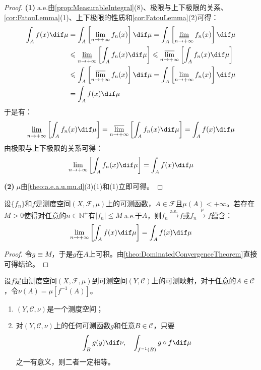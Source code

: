 \begin{proof}
	\textbf{(1)$\;\text{a.e.}$}由\cref{prop:MeasurableIntegral}(8)、极限与上下极限的关系、\cref{cor:FatouLemma}(1)、上下极限的性质和\cref{cor:FatouLemma}(2)可得：
	\begin{align*}
		\int_{A}f(x)\dif\mu&=\int_{A}\left[\lim_{n\to+\infty}f_n(x)\right]\dif\mu=\int_{A}\left[\varliminf_{n\to+\infty}f_n(x)\right]\dif\mu \\
		&\leqslant\varliminf_{n\to+\infty}\left[\int_{A}f_n(x)\dif\mu\right]\leqslant\varlimsup_{n\to+\infty}\left[\int_{A}f_n(x)\dif\mu\right] \\
		&\leqslant\int_{A}\left[\varlimsup_{n\to+\infty}f_n(x)\right]\dif\mu=\int_{A}\left[\lim_{n\to+\infty}f_n(x)\right]\dif\mu \\
		&=\int_{A}f(x)\dif\mu
	\end{align*}
	于是有：
	\begin{equation*}
		\varliminf_{n\to+\infty}\left[\int_{A}f_n(x)\dif\mu\right]=\varlimsup_{n\to+\infty}\left[\int_{A}f_n(x)\dif\mu\right]=\int_{A}f(x)\dif\mu
	\end{equation*}
	由极限与上下极限的关系可得：
	\begin{equation*}
		\lim_{n\to+\infty}\left[\int_{A}f_n(x)\dif\mu\right]=\int_{A}f(x)\dif\mu
	\end{equation*}\par
	\textbf{(2)$\;\mu$}由\cref{theo:a.e.a.u.mu.d}(3)(1)和(1)立即可得。
\end{proof}
\begin{corollary}[Lebesgue有界收敛定理]
	设$\{f_n\}$和$f$是测度空间$(X,\mathscr{F},\mu)$上的可测函数，$A\in\mathscr{F}$且$\mu(A)<+\infty$。若存在$M>0$使得对任意的$n\in\mathbb{N}^+$有$|f_n|\leqslant M\;$a.e.于$A$，则$f_n\overset{\text{a.e.}}{\longrightarrow}f$或$f_n\overset{\mu}{\longrightarrow}f$蕴含：
	\begin{equation*}
		\lim_{n\to+\infty}\left[\int_{A}f(x)\dif\mu\right]=\int_{A}f(x)\dif\mu
	\end{equation*}
\end{corollary}
\begin{proof}
	令$g\equiv M$，于是$g$在$A$上可积。由\cref{theo:DominatedConvergenceTheorem}直接可得结论。
\end{proof}
\begin{theorem}
	设$f$是由测度空间$(X,\mathscr{F},\mu)$到可测空间$(Y,\mathscr{C})$上的可测映射，对于任意的$A\in\mathscr{C}$，令$\nu(A)=\mu[f^{-1}(A)]$。
	\begin{enumerate}
		\item $(Y,\mathscr{C},\nu)$是一个测度空间；
		\item 对$(Y,\mathscr{C},\nu)$上的任何可测函数$g$和任意$B\in\mathscr{C}$，只要
		\begin{equation*}
			\int_Bg(y)\dif\nu,\quad\int_{f^{-1}(B)}g\circ f\dif\mu
		\end{equation*}
		之一有意义，则二者一定相等。
	\end{enumerate}
\end{theorem}

